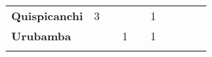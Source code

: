 \begin{tabular}{lccccccccc}
	\textbf{Quispicanchi}                      & 3			  							&\cellcolor[HTML]{FCC46C}                  & \cellcolor[HTML]{FCC46C}                 &\cellcolor[HTML]{FCC46C}                &1                   &\cellcolor[HTML]{FCC46C}                  & \cellcolor[HTML]{FCC46C}               &\cellcolor[HTML]{FCC46C} 			& \cellcolor[HTML]{FCC46C}\\
	\textbf{Urubamba}                          & \cellcolor[HTML]{FCC46C}                         &\cellcolor[HTML]{FCC46C}                  & 1                   			       &\cellcolor[HTML]{FCC46C}                     & 1                    					   & \cellcolor[HTML]{FCC46C}                                             &\cellcolor[HTML]{FCC46C}                  & \cellcolor[HTML]{FCC46C} 			   &\cellcolor[HTML]{FCC46C}\\
	&\multicolumn{1}{l}{}                        & \multicolumn{1}{l}{}      & \multicolumn{1}{l}{}                         & \multicolumn{1}{l}{}                         & \multicolumn{1}{l}{}                         & \multicolumn{1}{l}{}                        & \multicolumn{1}{l}{}                         & \multicolumn{1}{l}{}                         & \multicolumn{1}{l}{}    
\end{tabular}